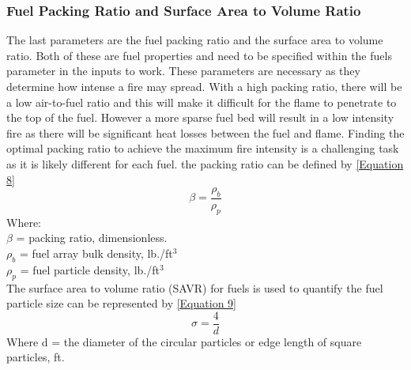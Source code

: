 \documentclass{article}
\begin{document}
 \subsubsection{Fuel Packing Ratio and Surface Area to Volume Ratio}
 \indent The last parameters are the fuel packing ratio and the surface area to volume ratio. Both of these are fuel properties and need to be specified within the fuels parameter in the inputs to work. These parameters are necessary as they determine how intense a fire may spread. With a high packing ratio, there will be a low air-to-fuel ratio and this will make it difficult for the flame to penetrate to the top of the fuel. However a more sparse fuel bed will result in a low intensity fire as there will be significant heat losses between the fuel and flame. Finding the optimal packing ratio to achieve the maximum fire intensity is a challenging task as it is likely different for each fuel. the packing ratio can be defined by \ref{Equation 8}
 \begin{equation}
 	\beta = \frac {\rho _ b } {\rho _ p} 
 \end{equation}
Where: \\
$\beta$ = packing ratio, dimensionless. \\
$\rho _ b$ = fuel array bulk density, lb./ft$^3$ \\
$\rho _ p$ = fuel particle density, lb./ft$^3$ \\

\indent The surface area to volume ratio (SAVR) for fuels is used to quantify the fuel particle size can be represented by \ref{Equation 9}
\begin{equation}
	\label{Equation 9}
	\sigma = \frac {4} {d} 
\end{equation}
 Where d = the diameter of the circular particles or edge length of square particles, ft. \\
\end{document}
